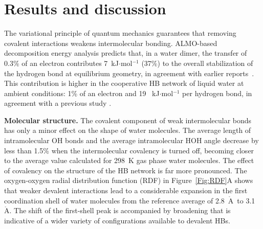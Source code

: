 \documentclass[journal=jacsat,manuscript=article]{achemso}
\newcommand{\Ang}{\ensuremath{\mathring{\text{A}}}}
\begin{document}

\section{Results and discussion}

The variational principle of quantum mechanics guarantees that removing covalent interactions weakens intermolecular bonding. 
ALMO-based decomposition energy analysis predicts that, in a water dimer, the transfer of 0.3\% of an electron contributes  7~kJ$\cdot$mol$^{-1}$ (37\%) to the overall stabilization of the hydrogen bond at equilibrium geometry, in agreement with earlier reports~\cite{stevens1987frozen,chen1996energy,piquemal2005csov,khaliullin2009electron}. This contribution is higher in the cooperative HB network of liquid water at ambient conditions: 1\% of an electron and 19 ~kJ$\cdot$mol$^{-1}$ per hydrogen bond, in agreement with a previous study \cite{kuhne2014nature}.

\textbf{Molecular structure.} The covalent component of weak intermolecular bonds has only a minor effect on the shape of water molecules. 
%
The average length of intramolecular OH bonds and the average intramolecular HOH angle decrease by less than 1.5\% when the intermolecular covalency is turned off, becoming closer to the average value calculated for 298~K gas phase water molecules. 
The effect of covalency on the structure of the HB network is far more pronounced. 
The oxygen-oxygen radial distribution function (RDF) in Figure~\ref{Fig:RDF}A shows that weaker devalent interactions lead to a considerable expansion in the first coordination shell of water molecules from the reference average of 2.8~\Ang\ to 3.1~\Ang. 
The shift of the first-shell peak is accompanied by broadening that is indicative of a wider variety of configurations available to devalent HBs.
\end{document}
